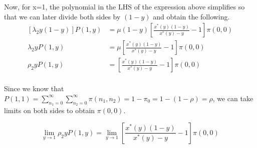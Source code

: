     Now, for x=1, the polynomial in the LHS of the expression above simplifies so that we can later divide both sides by $(1-y)$ and obtain the following.
    \begin{align*}
         \left[ \lambda_2 y(1-y) \right] P(1,y)
         &= \mu (1-y) \left[ \frac{x^*(y) (1-y)}{x^*(y) - y} - 1 \right] \pi(0,0) \\
         \lambda_2 y P(1,y)
         &= \mu \left[ \frac{x^*(y) (1-y)}{x^*(y) - y} - 1 \right] \pi(0,0) \\
         \rho_2 y P(1,y)
         &= \left[ \frac{x^*(y) (1-y)}{x^*(y) - y} - 1 \right] \pi(0,0) \\
    \end{align*}
    
    Since we know that $P(1,1)=\sum_{n_1=0}^{\infty}\sum_{n_2=0}^{\infty} \pi(n_1,n_2) = 1-\pi_0 = 1 - (1-\rho)= \rho$, we can take limits on both sides to obtain $\pi(0,0)$.
    
    \begin{equation}
        \lim_{y\to 1} \rho_2 y P(1,y) =  \lim_{y\to 1} \left[ \frac{x^*(y) (1-y)}{x^*(y) - y} - 1 \right] \pi(0,0) 
    \end{equation}
    
